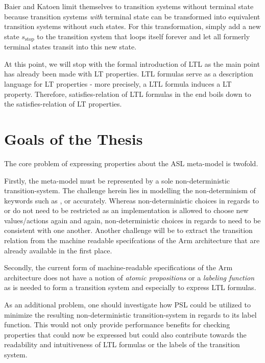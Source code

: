 \documentclass{securem}
\begin{document}
Baier and Katoen limit themselves to transition systems without terminal state because transition systems \textit{with} terminal state can be transformed into equivalent transition systems without such states.
For this transformation, simply add a new state $ s_{\text{stop}} $ to the transition system that loops itself forever and let all formerly terminal states transit into this new state.

At this point, we will stop with the formal introduction of LTL as the main point has already been made with LT properties.
LTL formulas serve as a description language for LT properties - more precisely, a LTL formula induces a LT property.
Therefore, satisfies-relation of LTL formulas in the end boils down to the satisfies-relation of LT properties.

\section{Goals of the Thesis}

The core problem of expressing properties about the ASL meta-model is twofold.

Firstly, the meta-model must be represented by a sole non-deterministic transition-system.
The challenge herein lies in modelling the non-determinism of keywords such as ,  or  accurately.
Whereas non-deterministic choices in regards to  or  do not need to be restricted as an implementation is allowed to choose new values/actions again and again, non-deterministic choices in regards to  need to be consistent with one another.
Another challenge will be to extract the transition relation from the machine readable specifcations of the Arm architecture that are already available in the first place.

Secondly, the current form of machine-readable specifications of the Arm architecture does not have a notion of \textit{atomic propositions} or a \textit{labeling function} as is needed to form a transition system and especially to express LTL formulas.

As an additional problem, one should investigate how PSL could be utilized to minimize the resulting non-deterministic transition-system in regards to its label function.
This would not only provide performance benefits for checking properties that could now be expressed but could also contribute towards the readability and intuitiveness of LTL formulas or the labels of the transition system.
\end{document}
